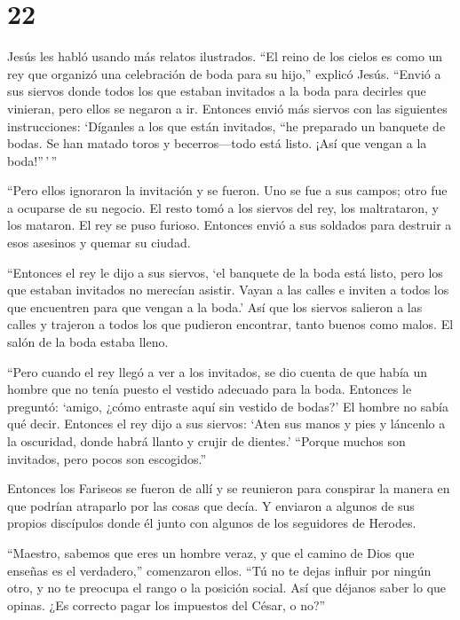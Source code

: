 \hypertarget{section-21}{%
\section{22}\label{section-21}}

 Jesús les habló usando más relatos ilustrados. 
``El reino de los cielos es como un rey que organizó una celebración de
boda para su hijo,'' explicó Jesús.  ``Envió a sus siervos
donde todos los que estaban invitados a la boda para decirles que
vinieran, pero ellos se negaron a ir.  Entonces envió más
siervos con las siguientes instrucciones: `Díganles a los que están
invitados, ``he preparado un banquete de bodas. Se han matado toros y
becerros---todo está listo. ¡Así que vengan a la boda!''\,'\,''

 ``Pero ellos ignoraron la invitación y se fueron. Uno se
fue a sus campos; otro fue a ocuparse de su negocio.  El
resto tomó a los siervos del rey, los maltrataron, y los mataron.
 El rey se puso furioso. Entonces envió a sus soldados para
destruir a esos asesinos y quemar su ciudad.

 ``Entonces el rey le dijo a sus siervos, `el banquete de la
boda está listo, pero los que estaban invitados no merecían asistir.
 Vayan a las calles e inviten a todos los que encuentren
para que vengan a la boda.'  Así que los siervos salieron a
las calles y trajeron a todos los que pudieron encontrar, tanto buenos
como malos. El salón de la boda estaba lleno.

 ``Pero cuando el rey llegó a ver a los invitados, se dio
cuenta de que había un hombre que no tenía puesto el vestido adecuado
para la boda.  Entonces le preguntó: `amigo, ¿cómo entraste
aquí sin vestido de bodas?' El hombre no sabía qué decir. 
Entonces el rey dijo a sus siervos: `Aten sus manos y pies y láncenlo a
la oscuridad, donde habrá llanto y crujir de dientes.' 
``Porque muchos son invitados, pero pocos son escogidos.''

 Entonces los Fariseos se fueron de allí y se reunieron
para conspirar la manera en que podrían atraparlo por las cosas que
decía.  Y enviaron a algunos de sus propios discípulos
donde él junto con algunos de los seguidores de Herodes.

``Maestro, sabemos que eres un hombre veraz, y que el camino de Dios que
enseñas es el verdadero,'' comenzaron ellos. ``Tú no te dejas influir
por ningún otro, y no te preocupa el rango o la posición social.
 Así que déjanos saber lo que opinas. ¿Es correcto pagar
los impuestos del César, o no?''

